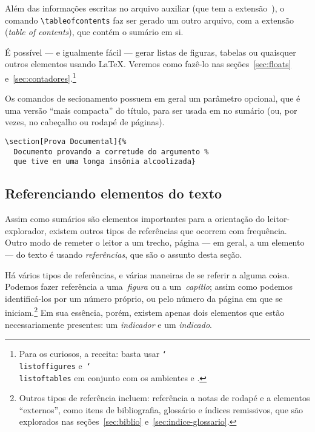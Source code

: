 Além das informações escritas no arquivo auxiliar (que tem a
extensão~), o comando \verb'\tableofcontents' faz ser
gerado um outro arquivo, com a extensão  (\emph{table of
  contents}), que contém o sumário em si. 

É possível --- e igualmente fácil --- gerar listas de figuras, tabelas
ou quaisquer outros elementos usando \LaTeX. Veremos como fazê-lo nas
seções~\ref{sec:floats} e~\ref{sec:contadores}.\footnote{Para os
  curiosos, a receita: basta usar  \texttt{\char`\\{}listoffigures}
  e~\texttt{\char`\\{}listoftables} em conjunto com os ambientes
   e .}


Os comandos de secionamento possuem em geral um parâmetro opcional,
que é uma versão ``mais compacta'' do título, para ser usada em no
sumário (ou, por vezes, no cabeçalho ou rodapé de páginas).
\begin{footnotesize}
\begin{verbatim}
\section[Prova Documental]{%
  Documento provando a corretude do argumento %
  que tive em uma longa insônia alcoolizada}
\end{verbatim}
\end{footnotesize}


\subsection{Referenciando elementos do texto}

Assim como sumários são elementos importantes para a orientação do leitor-explorador, existem outros tipos de referências que ocorrem com frequência. Outro modo de remeter o leitor a um trecho, página --- em geral, a um elemento --- do texto é usando \emph{referências}, que são o assunto desta seção.

Há vários tipos de referências, e várias maneiras de se referir a
alguma coisa. Podemos fazer referência a uma~\emph{figura} ou a
um~\emph{capítlo}; assim como podemos identificá-los por um número
próprio, ou pelo número da página em que se iniciam.\footnote{Outros
  tipos de referência incluem: referência a notas de rodapé e a
  elementos ``externos'', como itens de bibliografia, glossário e
  índices remissivos, que são explorados nas seções~\ref{sec:biblio} 
  e~\ref{sec:indice-glossario}.} Em sua essência, porém, existem
apenas dois elementos que estão necessariamente presentes: um
\emph{indicador} e um \emph{indicado}.

